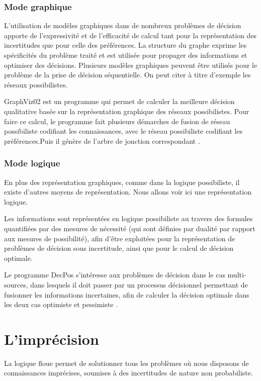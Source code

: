 \subsubsection{Mode graphique}
L’utilisation de modèles graphiques dans de nombreux problèmes de décision apporte de
l’expressivité et de l’efficacité de calcul tant pour la représentation des incertitudes que pour celle
des préférences. La structure du graphe exprime les spécificités du problème traité et est utilisée
pour propager des informations et optimiser des décisions. Plusieurs modèles graphiques peuvent
être utilisés pour le problème de la prise de décision séquentielle. On peut citer à titre d’exemple les réseaux possibilistes.

GraphViz02 est un programme qui permet de calculer la meilleure décision qualitative basée sur la représentation graphique des réseaux possibilistes. Pour faire ce calcul, le programme fait plusieurs démarches de fusion de réseau possibiliste codifiant les connaissances, avec le réseau possibiliste codifiant les préférences.Puis il génère de l’arbre de jonction correspondant \cite{hkhaoulaThesis}.
\subsubsection{Mode logique}
En plus des représentation graphiques, comme dans la logique possibiliste, il existe d’autres moyens de
représentation. Nous allons voir ici une représentation logique.

Les informations sont représentées en logique possibiliste au travers des formules quantifiées par des mesures de nécessité (qui sont définies par dualité par rapport aux mesures de possibilité), afin d'être exploitées pour la représentation de problèmes de décision sous incertitude, ainsi que pour le calcul de décision optimale.

Le programme DecPos s'intéresse aux problèmes de décision dans le cas multi-sources, dans lesquels il doit passer par un processus décisionnel permettant de fusionner les informations incertaines, afin de calculer la décision optimale dans les deux cas optimiste et pessimiste \cite{Noughithese}.

\section{L’imprécision}

La logique floue permet de solutionner tous les problèmes où nous disposons de connaissances imprécises, soumises à des incertitudes de nature non probabiliste.

